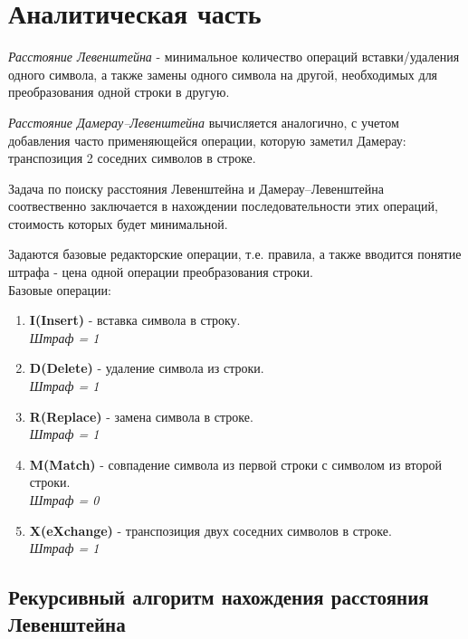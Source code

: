 \chapter{Аналитическая часть}

\textit{Расстояние Левенштейна} - минимальное количество операций вставки/удаления одного символа, а также замены одного символа на другой, необходимых для преобразования одной строки в другую.

\textit{Расстояние Дамерау--Левенштейна} вычисляется аналогично, с учетом добавления часто применяющейся операции, которую заметил Дамерау: транспозиция 2 соседних символов в строке.

Задача по поиску расстояния Левенштейна и Дамерау--Левенштейна соотвественно заключается в нахождении последовательности этих операций, стоимость которых будет минимальной.

Задаются базовые редакторские операции, т.е. правила, а также вводится понятие штрафа - цена одной операции преобразования строки.
\\

Базовые операции:
\begin{enumerate}
	\item \textbf{I(Insert)} - вставка символа в строку. \\
	\textit{Штраф = 1}
	\item \textbf{D(Delete)} - удаление символа из строки. \\
	\textit{Штраф = 1}
	\item \textbf{R(Replace)} - замена символа в строке. \\
	\textit{Штраф = 1}
	\item\textbf{M(Match)} - совпадение символа из первой строки с символом из второй строки. \\
	\textit{Штраф = 0}
	\item \textbf{X(eXchange)} - транспозиция двух соседних символов в строке. \\
	\textit{Штраф = 1}
\end{enumerate}

\clearpage

\section{Рекурсивный алгоритм нахождения расстояния Левенштейна}

